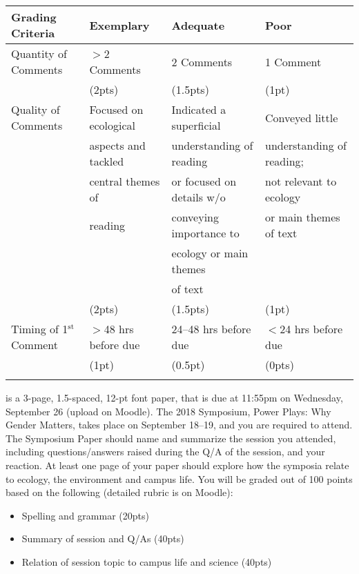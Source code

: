 \documentclass{tufte-handout}
\begin{document}
\begin{fullwidth}
\begin{tabular}{l l l l}
\\
\hline
\textbf{Grading Criteria} & \textbf{Exemplary} & \textbf{Adequate} & \textbf{Poor} \\
\hline
Quantity of Comments & $>$2 Comments & 2 Comments & 1 Comment \\
& (2pts) & (1.5pts) & (1pt) \\
\hline
Quality of Comments & Focused on ecological & Indicated a superficial & Conveyed little \\
& aspects and tackled & understanding of reading & understanding of reading; \\
& central themes of & or focused on details w/o& not relevant to ecology \\
& reading &  conveying importance to & or main themes of text \\
& & ecology or main themes & \\
& & of text & \\
& (2pts) & (1.5pts) & (1pt) \\
\hline
Timing of 1$^\mathrm{st}$ Comment & $>$48 hrs before due & 24--48 hrs before due & $<$24 hrs before due \\
& (1pt) & (0.5pt) & (0pts) \\
\hline \\
\end{tabular}

 is a 3-page, 1.5-spaced, 12-pt font paper, that is due at 
11:55pm on Wednesday, September 26 (upload on Moodle). 											%
The 2018 Symposium, Power Plays: Why Gender Matters, %
takes place on September 18--19, 													 %
and you are required to attend. The Symposium Paper should name and summarize the session you attended, including questions/answers raised during the Q/A of the session, and your reaction. At least one page of your paper should explore how the symposia relate to ecology, the environment and campus life. You will be graded out of 100 points based on the following (detailed rubric is on Moodle): 

\begin{itemize}
\item Spelling and grammar (20pts)
\item Summary of session and Q/As (40pts)
\item Relation of session topic to campus life and science (40pts)
\end{itemize}


\newpage


\end{fullwidth}
\end{document}
